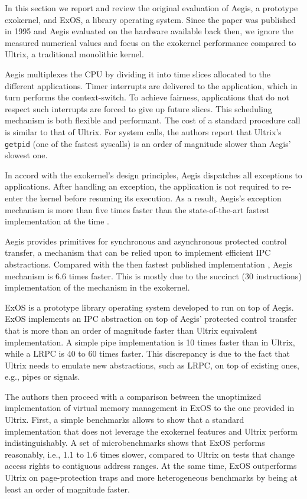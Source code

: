 
In this section we report and review the original evaluation of Aegis, a prototype exokernel, and ExOS, a library operating system.
Since the paper was published in 1995 and Aegis evaluated on the hardware available back then, we ignore the measured numerical values and focus on the exokernel performance compared to Ultrix, a traditional monolithic kernel.

Aegis multiplexes the CPU by dividing it into time slices allocated to the different applications.
Timer interrupts are delivered to the application, which in turn performs the context-switch.
To achieve fairness, applications that do not respect such interrupts are forced to give up future slices.
This scheduling mechanism is both flexible and performant.
The cost of a standard procedure call is similar to that of Ultrix.
For system calls, the authors report that Ultrix's \lstinline{getpid} (one of the fastest syscalls) is an order of magnitude slower than Aegis' slowest one.

In accord with the exokernel's design principles, Aegis dispatches all exceptions to applications.
After handling an exception, the application is not required to re-enter the kernel before resuming its execution.
As a result, Aegis's exception mechanism is more than five times faster than the state-of-the-art fastest implementation at the time \cite{DBLP:conf/asplos/ThekkathL94}.

Aegis provides primitives for synchronous and asynchronous protected control transfer, a mechanism that can be relied upon to implement efficient IPC abstractions.
Compared with the then fastest published implementation \cite{DBLP:conf/sosp/Liedtke93}, Aegis mechanism is 6.6 times faster.
This is mostly due to the succinct (30 instructions) implementation of the mechanism in the exokernel.

ExOS is a prototype library operating system developed to run on top of Aegis.
ExOS implements an IPC abstraction on top of Aegis' protected control transfer that is more than an order of magnitude faster than Ultrix equivalent implementation.
A simple pipe implementation is 10 times faster than in Ultrix, while a LRPC is 40 to 60 times faster.
This discrepancy is due to the fact that Ultrix needs to emulate new abstractions, such as LRPC, on top of existing ones, e.g., pipes or signals.

The authors then proceed with a comparison between the unoptimized implementation of virtual memory management in ExOS to the one provided in Ultrix.
First, a simple benchmarks allows to show that a standard implementation that does not leverage the exokernel features and Ultrix perform indistinguishably.
A set of microbenchmarks shows that ExOS performs reasonably, i.e., 1.1 to 1.6 times slower, compared to Ultrix on tests that change access rights to contiguous address ranges.
At the same time, ExOS outperforms Ultrix on page-protection traps and more heterogeneous benchmarks by being at least an order of magnitude faster.